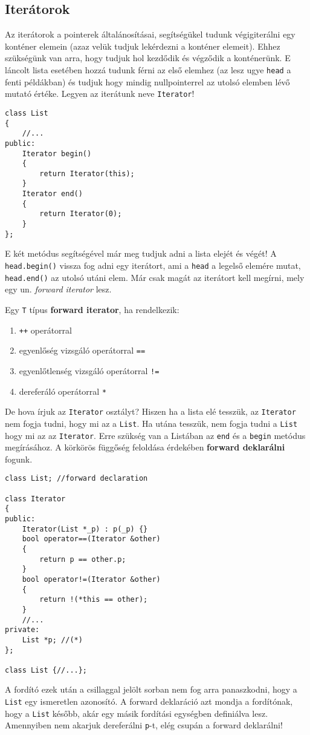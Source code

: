 \documentclass[a4paper,11.5pt,table]{article}
\begin{document}
	\subsection{Iterátorok}
	Az iterátorok a pointerek általánosításai, segítségükel tudunk végigiterálni egy konténer elemein (azaz velük tudjuk lekérdezni a konténer elemeit). Ehhez szükségünk van arra, hogy tudjuk hol kezdődik és végződik a konténerünk. E láncolt lista esetében hozzá tudunk férni az első elemhez (az lesz ugye \texttt{head} a fenti példákban) és tudjuk hogy mindig nullpointerrel az utolsó elemben lévő mutató értéke. Legyen az iterátunk neve \texttt{Iterator}!
\begin{lstlisting}
class List
{
	//...
public:
	Iterator begin()
	{
		return Iterator(this);
	}
	Iterator end()
	{
		return Iterator(0);
	}
};
\end{lstlisting}
	E két metódus segítségével már meg tudjuk adni a lista elejét és végét! A \texttt{head.begin()} vissza fog adni egy iterátort, ami a \texttt{head} a legelső elemére mutat, \texttt{head.end()} az utolsó utáni elem. Már csak magát az iterátort kell megírni, mely egy un. \textit{forward iterator} lesz.
	\medskip

	Egy \texttt{T} típus \textbf{forward iterator}, ha rendelkezik:
	\begin{enumerate}
		\item \texttt{++} operátorral
		\item egyenlőség vizsgáló operátorral \texttt{==}
		\item egyenlőtlenség vizsgáló operátorral \texttt{!=}
		\item dereferáló operátorral \texttt{*}
	\end{enumerate}
	De hova írjuk az \texttt{Iterator} osztályt? Hiszen ha a lista elé tesszük, az \texttt{Iterator} nem fogja tudni, hogy mi az a \texttt{List}. Ha utána tesszük, nem fogja tudni a \texttt{List} hogy mi az az \texttt{Iterator}. Erre szükség van a Listában az \texttt{end} és a \texttt{begin} metódus megírásához. A körkörös függőség feloldása érdekében \textbf{forward deklarálni} fogunk.
	\begin{lstlisting}
class List; //forward declaration

class Iterator
{
public:
	Iterator(List *_p) : p(_p) {}
	bool operator==(Iterator &other)
	{
		return p == other.p;
	}
	bool operator!=(Iterator &other)
	{
		return !(*this == other);
	}
	//...
private:
	List *p; //(*)
};

class List {//...};
	\end{lstlisting}
	A fordító ezek után a csillaggal jelölt sorban nem fog arra panaszkodni, hogy a \texttt{List} egy ismeretlen azonosító. A forward deklaráció azt mondja a fordítónak, hogy a \texttt{List} később, akár egy másik fordítási egységben definiálva lesz. Amennyiben nem akarjuk dereferálni \texttt{p}-t, elég csupán a forward deklarálni!
	
\end{document}
